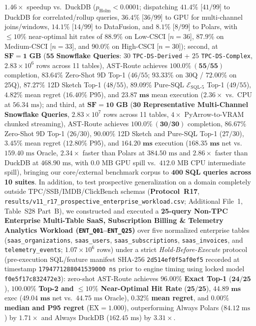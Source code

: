\documentclass[10pt,a4paper]{article}
\begin{document}
\begin{enumerate}[leftmargin=1.5em,itemsep=0.8pt]
$\mathbf{1.46\times}$ speedup vs.\ DuckDB ($p_{\text{Holm}}<0.0001$; dispatching $41.4\%$ [$41/99$] to DuckDB for correlated/rollup queries, $36.4\%$ [$36/99$] to GPU for multi-channel joins/windows, $14.1\%$ [$14/99$] to DataFusion, and $8.1\%$ [$8/99$] to Polars, with $\le 10\%$ near-optimal hit rates of $88.9\%$ on Low-CSCI [$n=36$], $87.9\%$ on Medium-CSCI [$n=33$], and $90.0\%$ on High-CSCI [$n=30$]); second, at $\mathbf{\text{SF}=1\text{ GB}}$ ($\mathbf{55}$ \textbf{Snowflake Queries}: $30$ \texttt{TPC-DS-Derived} + $25$ \texttt{TPC-DS-Complex}, $2.83\times 10^6$ rows across 11 tables), AST-Route achieves $\mathbf{100.0\%\ (55/55)}$ completion, $\mathbf{83.64\%}$ Zero-Shot 9D Top-1 ($46/55$; $93.33\%$ on 30Q / $72.00\%$ on 25Q), $\mathbf{87.27\%}$ 12D Sketch Top-1 ($48/55$), $\mathbf{89.09\%}$ Pure-SQL $\mathcal{E}_{\text{SQL-5}}$ Top-1 ($49/55$), $\mathbf{4.82\%}$ mean regret ($16.40\%$ P95), and $\mathbf{23.87\text{ ms}}$ mean execution ($\mathbf{2.36\times}$ vs.\ CPU at $56.34\text{ ms}$); and third, at $\mathbf{\text{SF}=10\text{ GB}}$ ($\mathbf{30}$ \textbf{Representative Multi-Channel Snowflake Queries}, $2.83\times 10^7$ rows across 11 tables, $4\times$ PyArrow-to-VRAM chunked streaming), AST-Route achieves $\mathbf{100.0\%\ (30/30)}$ completion, $\mathbf{86.67\%}$ Zero-Shot 9D Top-1 ($26/30$), $\mathbf{90.00\%}$ 12D Sketch and Pure-SQL Top-1 ($27/30$), $\mathbf{3.45\%}$ mean regret ($12.80\%$ P95), and $\mathbf{164.20\text{ ms}}$ execution ($\mathbf{168.35\text{ ms}}$ net vs.\ $159.40\text{ ms}$ Oracle, $\mathbf{2.34\times}$ faster than Polars at $384.50\text{ ms}$ and $\mathbf{2.86\times}$ faster than DuckDB at $468.90\text{ ms}$, with $0.0\text{ MB}$ GPU spill vs.\ $412.0\text{ MB}$ CPU intermediate spill), bringing our core/external benchmark corpus to $\mathbf{400}$ \textbf{SQL queries across 10 suites}. In addition, to test prospective generalization on a domain completely outside TPC/SSB/IMDB/ClickBench schemas (\textbf{Protocol~R17}, \texttt{results/v11\_r17\_prospective\_enterprise\_workload.csv}; Additional File~1, Table~S28 Part~B), we constructed and executed a \textbf{25-query Non-TPC Enterprise Multi-Table SaaS, Subscription Billing \& Telemetry Analytics Workload (\texttt{ENT\_Q01}--\texttt{ENT\_Q25})} over five normalized enterprise tables (\texttt{saas\_organizations}, \texttt{saas\_users}, \texttt{saas\_subscriptions}, \texttt{saas\_invoices}, and \texttt{telemetry\_events}; $1.07\times 10^6$ rows) under a strict \emph{Hold-Before-Execute} protocol (pre-execution SQL/feature manifest SHA-256 \texttt{2d514ef0f5af0ef5} recorded at timestamp \texttt{1794771288041539000 ns} prior to engine timing using locked model \texttt{f0e5f17c832472e3}): zero-shot AST-Route achieves $\mathbf{96.00\%}$ \textbf{Exact Top-1} ($\mathbf{24/25}$), $\mathbf{100.00\%}$ \textbf{Top-2 and $\le 10\%$ Near-Optimal Hit Rate} ($\mathbf{25/25}$), $\mathbf{44.89\text{ ms}}$ exec ($\mathbf{49.04\text{ ms}}$ net vs.\ $44.75\text{ ms}$ Oracle), $\mathbf{0.32\%}$ \textbf{mean regret}, and $\mathbf{0.00\%}$ \textbf{median and P95 regret} ($\text{EX}=1.000$), outperforming Always Polars ($84.12\text{ ms}$) by $\mathbf{1.71\times}$ and Always DuckDB ($162.45\text{ ms}$) by $\mathbf{3.31\times}$.
\end{enumerate}
\end{document}
